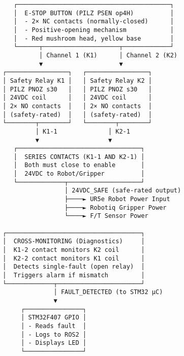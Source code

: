 \documentclass[
]{article}
\begin{document}
\begin{verbatim}
                        ┌──────────────────────────────────────────┐
                        │  E-STOP BUTTON (PILZ PSEN op4H)          │
                        │  - 2× NC contacts (normally-closed)      │
                        │  - Positive-opening mechanism            │
                        │  - Red mushroom head, yellow base        │
                        └──────┬─────────────────────┬─────────────┘
                               │ Channel 1 (K1)      │ Channel 2 (K2)
                               ▼                     ▼
                     ┌─────────────────┐   ┌─────────────────┐
                     │ Safety Relay K1 │   │ Safety Relay K2 │
                     │ PILZ PNOZ s30   │   │ PILZ PNOZ s30   │
                     │ 24VDC coil      │   │ 24VDC coil      │
                     │ 2× NO contacts  │   │ 2× NO contacts  │
                     │ (safety-rated)  │   │ (safety-rated)  │
                     └────────┬────────┘   └────────┬────────┘
                              │ K1-1              │ K2-1
                              ▼                   ▼
                        ┌──────────────────────────────────┐
                        │  SERIES CONTACTS (K1-1 AND K2-1) │
                        │  Both must close to enable       │
                        │  24VDC to Robot/Gripper          │
                        └─────────────┬────────────────────┘
                                      │ 24VDC_SAFE (safe-rated output)
                                      ├────► UR5e Robot Power Input
                                      ├────► Robotiq Gripper Power
                                      └────► F/T Sensor Power

                     ┌─────────────────────────────────────┐
                     │  CROSS-MONITORING (Diagnostics)     │
                     │  K1-2 contact monitors K2 coil      │
                     │  K2-2 contact monitors K1 coil      │
                     │  Detects single-fault (open relay)  │
                     │  Triggers alarm if mismatch         │
                     └─────────────┬───────────────────────┘
                                   │ FAULT_DETECTED (to STM32 µC)
                                   ▼
                          ┌────────────────┐
                          │ STM32F407 GPIO │
                          │ - Reads fault  │
                          │ - Logs to ROS2 │
                          │ - Displays LED │
                          └────────────────┘
\end{verbatim}
\end{document}
